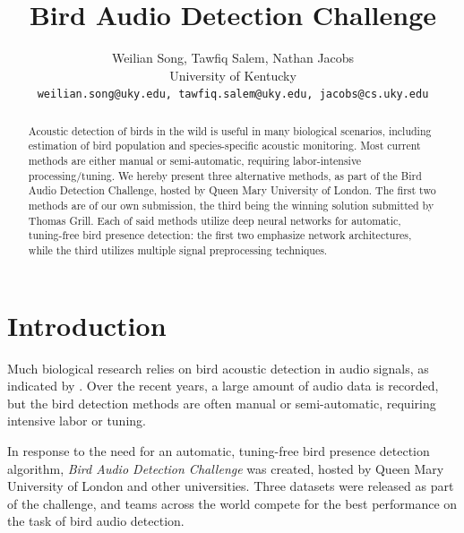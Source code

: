 \documentclass[10pt,twocolumn,letterpaper]{article}
\begin{document}
\title{Bird Audio Detection Challenge}

\author{
	Weilian Song, Tawfiq Salem, Nathan Jacobs\\ 
	University of Kentucky\\ 
	{\tt\small weilian.song@uky.edu, tawfiq.salem@uky.edu, jacobs@cs.uky.edu}
}


\maketitle

\begin{abstract}  

	Acoustic detection of birds in the wild is useful in many biological
	scenarios, including estimation of bird population and species-specific
	acoustic monitoring. Most current methods are either manual or
	semi-automatic, requiring labor-intensive processing/tuning. We hereby
	present three alternative methods, as part of the Bird Audio Detection
	Challenge, hosted by Queen Mary University of London. The first two
	methods are of our own submission, the third being the winning solution
	submitted by Thomas Grill. Each of said methods utilize deep neural
	networks for automatic, tuning-free bird presence detection: the first
	two emphasize network architectures, while the third utilizes multiple
	signal preprocessing techniques.

\end{abstract}

\section{Introduction}

Much biological research relies on bird acoustic detection in audio signals,
as indicated by \cite{bad}. Over the recent years, a large amount of audio
data is recorded, but the bird detection methods are often manual or
semi-automatic, requiring intensive labor or tuning.

In response to the need for an automatic, tuning-free bird presence
detection algorithm, \textit{Bird Audio Detection Challenge} was created,
hosted by Queen Mary University of London and other universities. Three
datasets were released as part of the challenge, and teams across the world
compete for the best performance on the task of bird audio detection.
\end{document}
